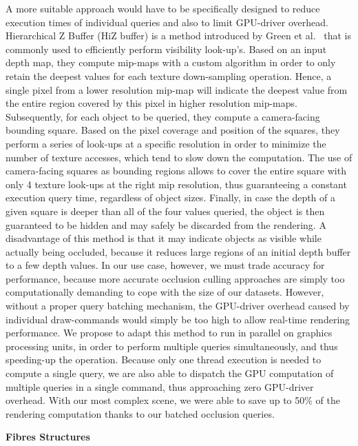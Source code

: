 A more suitable approach would have to be specifically designed to reduce execution times of individual queries and also to limit GPU-driver overhead.
Hierarchical Z Buffer (HiZ buffer) is a method introduced by Green et al.~\cite{greene1993hierarchical} that is commonly used to efficiently perform visibility look-up's.
Based on an input depth map, they compute mip-maps with a custom algorithm in order to only retain the deepest values for each texture down-sampling operation.
Hence, a single pixel from a lower resolution mip-map will indicate the deepest value from the entire region covered by this pixel in higher resolution mip-maps.
Subsequently, for each object to be queried, they compute a camera-facing bounding square.
Based on the pixel coverage and position of the squares, they perform a series of look-ups at a specific resolution in order to minimize the number of texture accesses, which tend to slow down the computation.
The use of camera-facing squares as bounding regions allows to cover the entire square with only 4 texture look-ups at the right mip resolution, thus guaranteeing a constant execution query time, regardless of object sizes.
Finally, in case the depth of a given square is deeper than all of the four values queried, the object is then guaranteed to be hidden and may safely be discarded from the rendering.
A disadvantage of this method is that it may indicate objects as visible while actually being occluded, because it reduces large regions of an initial depth buffer to a few depth values.
In our use case, however, we must trade accuracy for performance, because more accurate occlusion culling approaches are simply too computationally demanding to cope with the size of our datasets.
However, without a proper query batching mechanism, the GPU-driver overhead caused by individual draw-commands would simply be too high to allow real-time rendering performance.
We propose to adapt this method to run in parallel on graphics processing units, in order to perform multiple queries simultaneously, and thus speeding-up the operation.
Because only one thread execution is needed to compute a single query, we are also able to dispatch the GPU computation of multiple queries in a single command, thus approaching zero GPU-driver overhead.
With our most complex scene, we were able to save up to 50\% of the rendering computation thanks to our batched occlusion queries.
 
\textbf{Fibres Structures}


